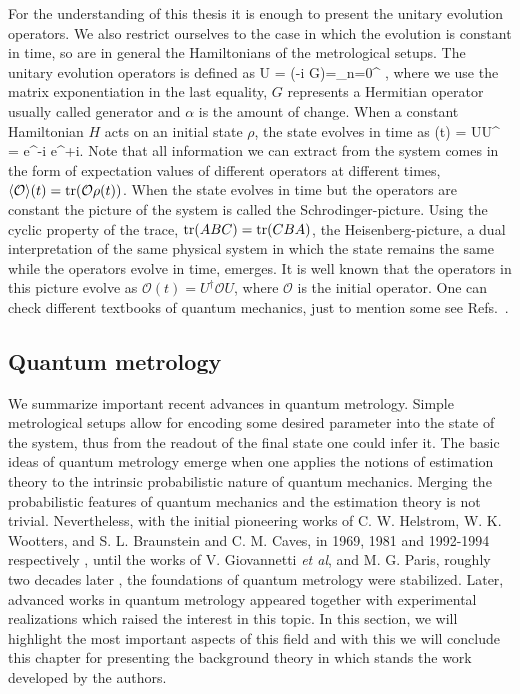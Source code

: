 For the understanding of this thesis it is enough to present the unitary evolution operators.
We also restrict ourselves to the case in which the evolution is constant in time, so are in general the Hamiltonians of the metrological setups.
The unitary evolution operators is defined as
\be
  U = \exp(-i \alpha G)=\sum_{n=0}^{\infty} ,
\ee
where we use the matrix exponentiation in the last equality, $G$ represents a Hermitian operator usually called generator and $\alpha$ is the amount of change.
When a constant Hamiltonian $H$ acts on an initial state $\rho$, the state evolves in time as
\be
  \rho(t) = U\rho U^{\dagger} = e^{-i} \rho e^{+i}.
\ee
Note that all information we can extract from the system comes in the form of expectation values of different operators at different times, $\langle{\mathcal{O}}\rangle(t) = \operatorname{tr}(\mathcal{O}\rho(t))$.
When the state evolves in time but the operators are constant the picture of the system is called the Schrodinger-picture.
Using the cyclic property of the trace, $\operatorname{tr}(ABC) = \operatorname{tr}(CBA)$, the Heisenberg-picture, a dual interpretation of the same physical system in which the state remains the same while the operators evolve in time, emerges.
It is well known that the operators in this picture evolve as $\mathcal{O}(t) = U^{\dagger} \mathcal{O} U$, where $\mathcal{O}$ is the initial operator.
One can check different textbooks of quantum mechanics, just to mention some see Refs.~\cite{Cohen-Tannoudji1977, Sakurai2010}.

\subsection{Quantum metrology}
\label{sec:bg-quantum-metrology}

We summarize important recent advances in quantum metrology.
Simple metrological setups allow for encoding some desired parameter into the state of the system, thus from the readout of the final state one could infer it.
The basic ideas of quantum metrology emerge when one applies the notions of estimation theory to the intrinsic probabilistic nature of quantum mechanics.
Merging the probabilistic features of quantum mechanics and the estimation theory is not trivial.
Nevertheless, with the initial pioneering works of C. W. Helstrom, W. K. Wootters, and S. L. Braunstein and C. M. Caves, in 1969, 1981 and 1992-1994 respectively \cite{Helstrom1969, Wootters1981, Braunstein1992, Braunstein1994}, until the works of V. Giovannetti {\it et al}, and M. G. Paris, roughly two decades later \cite{Giovannetti2004, Paris2009}, the foundations of quantum metrology were stabilized.
Later, advanced works in quantum metrology appeared \cite{Hyllus2010, Hyllus2012, Hyllus2010a, Kolodynski2010, Kolodynski2013}
together with experimental realizations \cite{Behbood2013, Koschorreck2011, Luecke2011} which raised the interest in this topic.
In this section, we will highlight the most important aspects of this field and with this we will conclude this chapter for presenting the background theory in which stands the work developed by the authors.

